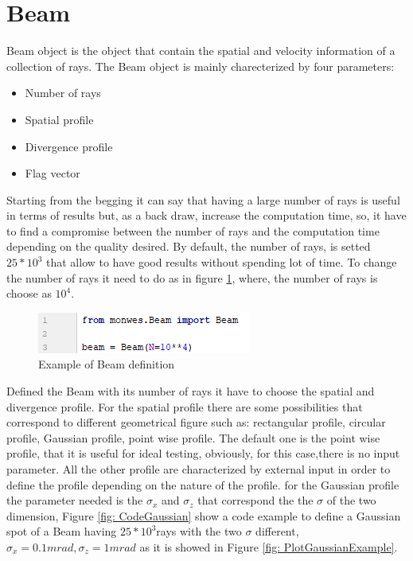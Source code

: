 \section{Beam}
Beam object is the object that contain the spatial and velocity information of a collection of rays. The Beam object is mainly charecterized by four parameters: 
\begin{itemize}
\item Number of rays
\item Spatial profile
\item Divergence profile
\item Flag vector
\end{itemize}
Starting from the begging it can say that having a large number of rays is useful in terms of results but, as a back draw, increase the computation time, so, it have to find a compromise between the number of rays and the computation time depending on the quality desired. By default, the number of rays, is setted $25*10^3 $ that allow to have good results without spending lot of time. To change the number of rays it need to do as in figure \ref{fig: BeamRays}, where, the number of rays is choose as $10^4 $.
\begin{figure}[H]
%
\centering
%
\includegraphics[width=.4\textwidth]{Immagini/Chapter3/BeamRays}
%
\caption{Example of Beam definition}
%
\label{fig: BeamRays}
%
\end{figure}
Defined the Beam with its number of rays it have to choose the spatial and divergence profile. For the spatial profile there are some possibilities that correspond to different geometrical figure such as: rectangular profile, circular profile, Gaussian profile, point wise profile. The default one is the point wise profile, that it is useful for ideal testing, obviously, for this case,there is no input parameter. All the other profile are characterized by external input in order to define the profile depending on the nature of the profile. for the Gaussian profile the parameter needed is the $\sigma_x $ and  
$\sigma_z $ that correspond the the $\sigma $ of the two dimension, Figure \ref{fig: CodeGaussian} show a code example to define a Gaussian spot of a Beam having $25*10^3 $rays with the two $\sigma $ different, $\sigma_x = 0.1mrad, \sigma_z = 1mrad $ as it is showed in Figure \ref{fig: PlotGaussianExample}.
%
